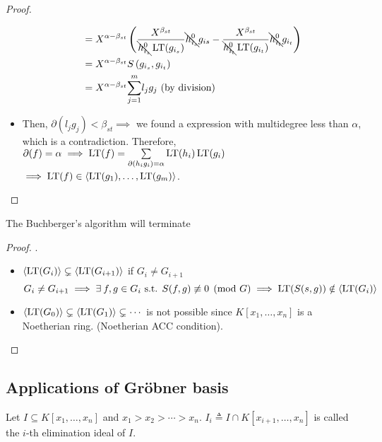 \begin{theorem}
\begin{proof}
\begin{itemize}
\[\begin{split}
            &= X^{\alpha-\beta_{st}} \left( \frac{X^{\beta_{st}}}{\bcancel{h_{i_s}^0}\operatorname{LT}(g_{i_s})}\bcancel{h_{i_s}^0}g_{is} - \frac{X^{\beta_{st}}}{\bcancel{h_{i_t}^0}\operatorname{LT}(g_{i_t})}\bcancel{h_{i_t}^0}g_{i_t}  \right) \\
            &= X^{\alpha-\beta_{st}} S\left(g_{i_s},g_{i_t}\right) \\
            &= X^{\alpha-\beta_{st}}\overset{m}{\underset{j = 1}{\sum}}{l_jg_j} \text{ (by division)}
          \end{split}
        \]
      \item Then, $\partial(l_jg_j) < \beta_{st} \implies$ we found a expression
        with multidegree less than $\alpha$, which is a contradiction.
        Therefore, $\partial(f) = \alpha \implies \operatorname{LT}(f) =
        \sum\limits_{\partial(h_ig_i) = \alpha} \operatorname{LT}(h_i)\operatorname{LT}(g_i)$
        $\implies \operatorname{LT}(f) \in \langle \operatorname{LT}(g_1),\dots, \operatorname{LT}(g_m) \rangle$.
    \end{itemize}
  \end{proof}
\end{theorem}

\begin{theorem}
  The Buchberger's algorithm will terminate
  \begin{proof}
    $.$
    \begin{itemize}
      \item $\langle \operatorname{LT}(G_i) \rangle \subsetneq \langle \operatorname{LT}(G_{i+1}) \rangle$ if $G_i \neq G_{i+1}$
        \[
          G_i \neq G_{i+1} \implies \exists f, g \in G_i \text{ s.t. } S(f,g)
          \not\equiv 0 \pmod G \implies \LT(S(s,g)) \notin \gen{\LT(G_i)}
        \]
      \item $\langle \operatorname{LT}(G_0) \rangle \subsetneq \langle \operatorname{LT}(G_1) \rangle \subsetneq \dotsm$
        is not possible since $K[x_1, \dots, x_n]$ is a Noetherian ring.
        (Noetherian ACC condition).
    \end{itemize}
  \end{proof}
\end{theorem}

\subsection{Applications of Gr\"{o}bner basis}
\begin{definition}
  Let $I \subseteq K[x_1, \dots, x_n]$ and $x_1 > x_2 > \dotsm > x_n$.
  $I_i \triangleq I \cap K[x_{i+1}, \dots, x_n]$ is called the $i$-th elimination
  ideal of $I$.
\end{definition}

